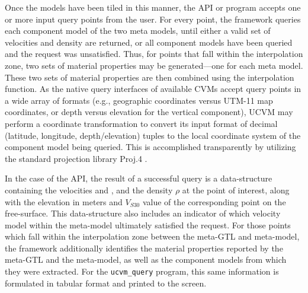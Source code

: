 Once the models have been tiled in this manner, the API or program accepts one or more input query points from the user. For every point, the framework queries each component model of the two meta models, until either a valid set of velocities and density are returned, or all component models have been queried and the request was unsatisfied. Thus, for points that fall within the interpolation zone, two sets of material properties may be generated---one for each meta model. These two sets of material properties are then combined using the interpolation function. As the native query interfaces of available CVMs accept query points in a wide array of formats (e.g., geographic coordinates versus UTM-11 map coordinates, or depth versus elevation for the vertical component), UCVM may perform a coordinate transformation to convert its input format of decimal (latitude, longitude, depth/elevation) tuples to the local coordinate system of the component model being queried. This is accomplished transparently by utilizing the standard projection library Proj.4 \citep{Evenden_2003_Manual}.

In the case of the API, the result of a successful query is a data-structure containing the velocities \vp{} and \vs{}, and the density $\rho$ at the point of interest, along with the elevation in meters and $V_{S30}$ value of the corresponding point on the free-surface. This data-structure also includes an indicator of which velocity model within the meta-model ultimately satisfied the request. For those points which fall within the interpolation zone between the meta-GTL and meta-model, the framework additionally identifies the material properties reported by the meta-GTL and the meta-model, as well as the component models from which they were extracted. For the \texttt{ucvm\_query} program, this same information is formulated in tabular format and printed to the screen.

